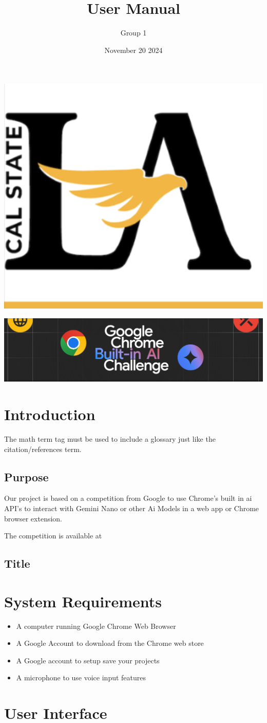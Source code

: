 \documentclass{article}
\title{User Manual}
\author{Group 1 }
\date{November 20 2024}
\begin{document}
\maketitle  
\pagebreak

\tableofcontents
\pagebreak

\includegraphics[width=0.3\linewidth]{../logo/csula.png} 

\includegraphics[width=0.3\linewidth]{../logo/chromeai.png} 
\section{Introduction}
The \Gls{math} term tag must be used to include a glossary just like the citation/references \gls{term}. 
\subsection{Purpose}
Our project is based on a competition from Google to use Chrome's built in \Gls{ai} API's to interact with Gemini Nano or other Ai Models in a web app or Chrome browser extension. 

The competition is available at \cite{devpost}

\cite{dev}

\subsection{Title}
\lipsum[2]
 

\section{System Requirements}
 \begin{itemize}
  \item A computer running Google Chrome Web Browser
  \item A Google Account to download from the Chrome web store
  \item A Google account to setup save your projects
  \item A microphone to use voice input features
\end{itemize}

\section{User Interface}
 

\pagebreak
\printglossaries

\printbibliography
\end{document}
